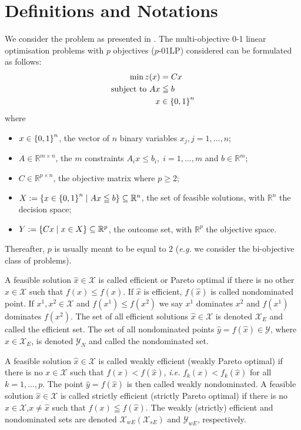 \section{Definitions and Notations}
We consider the problem as presented in \cite{gravitymachine}. The multi-objective 0-1 linear optimisation problems with $p$ objectives ($p$-01LP) considered can be formulated as follows:
\begin{align*}
    \min z(x)&=Cx\\
    \text{subject to } Ax &\leqq b\\
    x &\in \left\lbrace 0,1 \right\rbrace^n
\end{align*}
where
\begin{itemize}
    \item $x\in \left\lbrace 0,1 \right\rbrace^n$, the vector of $n$ binary variables $x_j, j=1,\ldots,n$;
    \item $A\in\mathbb{R}^{m\times n}$, the $m$ constraints $A_ix \leq b_i, \; i=1,\ldots,m$ and $b\in \mathbb{R}^m$;
    \item $C \in \mathbb{R}^{p\times n}$, the objective matrix where $p \geq 2$;
    \item $X:=\left\lbrace x\in\left\lbrace 0,1 \right\rbrace^n\mid Ax \leqq b \right\rbrace \subseteq \mathbb{R}^n$, the set of feasible solutions, with $\mathbb{R}^n$ the decision space;
    \item $Y:=\left\lbrace Cx\mid x \in X \right\rbrace\subseteq\mathbb{R}^p$, the outcome set, with $\mathbb{R}^p$ the objective space.
\end{itemize}
Thereafter, $p$ is usually meant to be equal to $2$ (\textit{e.g.} we consider the bi-objective class of problems).
\begin{definition}
A feasible solution $\hat{x}\in\mathcal{X}$ is called efficient or Pareto optimal if there is no other $x \in \mathcal{X}$ such that $f(x)\leq f(\hat{x})$. If $\hat{x}$ is efficient, $f(\hat{x})$ is called nondominated point. If $x^1, x^2 \in \mathcal{X}$ and $f(x^1)\leq f(x^2)$ we say $x^1$ dominates $x^2$ and $f(x^1)$ dominates $f(x^2)$. The set of all efficient solutions $\hat{x} \in \mathcal{X}$ is denoted $\mathcal{X}_E$ and called the efficient set. The set of all nondominated points $\hat{y}=f(\hat{x})\in\mathcal{Y}$, where $\hat{x}\in\mathcal{X}_E$, is denoted $\mathcal{Y}_N$ and called the nondominated set.
\end{definition}
\begin{definition}
A feasible solution $\hat{x}\in \mathcal{X}$ is called weakly efficient (weakly Pareto optimal) if there is no $x\in \mathcal{X}$ such that $f(x)<f(\hat{x})$, \textit{i.e.} $f_k(x)<f_k(\hat{x})$ for all $k=1,\ldots,p$. The point $\hat{y}=f(\hat{x})$ is then called weakly nondominated. A feasible solution $\hat{x}\in\mathcal{X}$ is called strictly efficient (strictly Pareto optimal) if there is no $x\in\mathcal{X}$,$x\neq\hat{x}$ such that $f(x)\leqq f(\hat{x})$. The weakly (strictly) efficient and nondominated sets are denoted $\mathcal{X}_{wE}(\mathcal{X}_{sE})$ and $ \mathcal{Y}_{wE}$, respectively. 
\end{definition}

